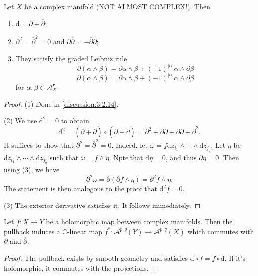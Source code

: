 \begin{lemma}\label{lma:3.2.15}
	Let $X$ be a complex manifold (NOT ALMOST COMPLEX!). Then
	\begin{enumerate}
		\item $\mathrm{d} =\partial + \overline{\partial } $;
		\item $\partial ^2 = \overline{\partial } ^2 = 0$ and $\partial \overline{\partial } =- \overline{\partial } \partial $;
		\item They satisfy the graded Leibniz rule
			\[
				\partial (\alpha \wedge \beta )=\partial \alpha \wedge \beta +(-1)^{\left| \alpha  \right| } \alpha \wedge \partial \beta 
			\]
			\[
				\partial (\alpha \wedge \beta )=\partial \alpha \wedge \beta +(-1)^{\left| \alpha  \right| } \alpha \wedge \partial \beta 
			\]
			for $\alpha ,\beta \in \mathcal{A} ^{\bullet} _X$.
	\end{enumerate}
\end{lemma}
\begin{proof}
	(1) Done in \cref{discussion:3.2.14}.

	(2) We use $\mathrm{d} ^2=0$ to obtain
	\[
		\mathrm{d} ^2 = \left( \partial +\overline{\partial }  \right) \circ \left( \partial +\overline{\partial }  \right) =\partial ^2 + \partial \overline{\partial } +\overline{\partial } \partial + \overline{\partial } ^2
	.\]
	It suffices to show that $\partial ^2= \overline{\partial } ^2=0$. Indeed, let $\omega =f\mathrm{d} z_{i_1} \wedge \cdots \wedge \mathrm{d} \overline{z} _{j_q} $. Let $\eta $ be $\mathrm{d} z_{i_1} \wedge \cdots \wedge \mathrm{d} \overline{z} _{j_q} $ such that $\omega =f\wedge \eta $. Npte that $\mathrm{d} \eta =0$, and thus $\partial \eta =0$. Then using (3), we have
	\[
		\partial ^2\omega =\partial (\partial f \wedge \eta ) = \partial ^2 f \wedge \eta
	.\]
	The statement is then analogous to the proof that $\mathrm{d} ^2f=0$.

	(3) The exterior derivative satisfies it. It follows immediately.
\end{proof}

\begin{proposition}\label{prp:3.2.16}
	Let $f : X \to Y$ be a holomorphic map between complex manifolds. Then the pullback induces a $\mathbb{C} $-linear map $f^* : \mathcal{A} ^{p,q}(Y) \to \mathcal{A} ^{p,q} (X)$ which commutes with $\partial $ and $\overline{\partial } $.
\end{proposition}
\begin{proof}
	The pullback exists by smooth geometry and satisfies $\mathrm{d} \circ f=f\circ \mathrm{d} $. If it's holomorphic, it commutes with the projections.
\end{proof}

